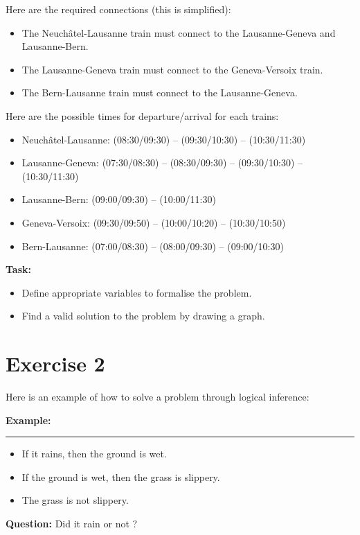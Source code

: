 \documentclass[11pt]{article}
\numberwithin{equation}{section}
\begin{document}
Here are the required connections (this is simplified):
\begin{itemize}
    \item The Neuchâtel-Lausanne train must connect to the Lausanne-Geneva and Lausanne-Bern.
    \item The Lausanne-Geneva train must connect to the Geneva-Versoix train.
    \item The Bern-Lausanne train must connect to the Lausanne-Geneva.
\end{itemize}

Here are the possible times for departure/arrival for each trains:
\begin{itemize}
    \item Neuchâtel-Lausanne: (08:30/09:30) -- (09:30/10:30) -- (10:30/11:30)
    \item Lausanne-Geneva: (07:30/08:30) -- (08:30/09:30) -- (09:30/10:30) -- (10:30/11:30)
    \item Lausanne-Bern: (09:00/09:30) -- (10:00/11:30)
    \item Geneva-Versoix: (09:30/09:50) -- (10:00/10:20) -- (10:30/10:50)
    \item Bern-Lausanne: (07:00/08:30) -- (08:00/09:30) -- (09:00/10:30)
\end{itemize}

\textbf{Task:}
\begin{itemize}
    \item Define appropriate variables to formalise the problem.
    \item Find a valid solution to the problem by drawing a graph.
\end{itemize}

\section*{Exercise 2}

Here is an example of how to solve a problem through logical inference:

\smallskip

\textbf{Example:} 

\noindent\rule{\linewidth}{0.4pt}
\begin{itemize}
    \item If it rains, then the ground is wet.
    \item If the ground is wet, then the grass is slippery.
    \item The grass is not slippery.
\end{itemize}
\textbf{Question:}  Did it rain or not ?
\end{document}
